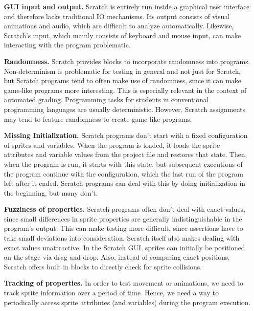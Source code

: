\textbf{GUI input and output.}
Scratch is entirely run inside a graphical user interface and therefore lacks traditional IO mechanisms.
Its output consists of visual animations and audio, which are difficult to analyze automatically.
Likewise, Scratch's input, which mainly consists of keyboard and mouse input, can make interacting with the program problematic.
\parspace

\textbf{Randomness.}
Scratch provides blocks to incorporate randomness into programs.
Non-determinism is problematic for testing in general and not just for Scratch,
but Scratch programs tend to often make use of randomness,
since it can make game-like programs more interesting.
This is especially relevant in the context of automated grading.
Programming tasks for students in conventional programming languages are usually deterministic.
However, Scratch assignments may tend to feature randomness to create game-like programs.
\parspace

\textbf{Missing Initialization.}
Scratch programs don't start with a fixed configuration of sprites and variables.
When the program is loaded, it loads the sprite attributes and variable values from the project file and restores that state.
Then, when the program is run, it starts with this state, but subsequent executions of the program continue with the configuration,
which the last run of the program left after it ended.
Scratch programs can deal with this by doing initialization in the beginning, but many don't.
\parspace

\textbf{Fuzziness of properties.}
Scratch programs often don't deal with exact values,
since small differences in sprite properties are generally indistinguishable in the program's output.
This can make testing more difficult, since assertions have to take small deviations into consideration.
Scratch itself also makes dealing with exact values unattractive.
In the Scratch GUI, sprites can initially be positioned on the stage via drag and drop.
Also, instead of comparing exact positions, Scratch offers built in blocks to directly check for sprite collisions.
\parspace

\textbf{Tracking of properties.}
In order to test movement or animations, we need to track sprite information over a period of time.
Hence, we need a way to periodically access sprite attributes (and variables) during the program execution.
\parspace
